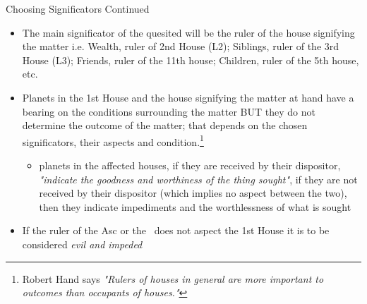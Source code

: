 \begin{frame}[t]{Choosing Significators Continued}
\begin{itemize}
\item The main significator of the quesited will be the ruler of the house signifying the matter i.e.  Wealth, ruler of 2nd House (L2); Siblings, ruler of the 3rd House (L3); Friends, ruler of the 11th house; Children, ruler of the 5th house, etc.
\item Planets in the 1st House and the house signifying the matter at hand have a bearing on the conditions surrounding the matter BUT they do not determine the outcome of the matter; that depends on the chosen significators, their aspects and condition.\footnote{Robert Hand says \textsl{"Rulers of houses in general are more important to outcomes than occupants of houses."}}
	\begin{itemize}
		\item planets in the affected houses, if they are received by their dispositor, \textsl{"indicate the goodness and worthiness of the thing sought"}, if they are not received by their dispositor (which implies no aspect between the two), then they indicate impediments and the worthlessness of what is sought
	\end{itemize}
\item If the ruler of the Asc or the \Moon\ does not aspect the 1st House it is to be considered \textsl{evil and impeded}
\end{itemize}

\end{frame}